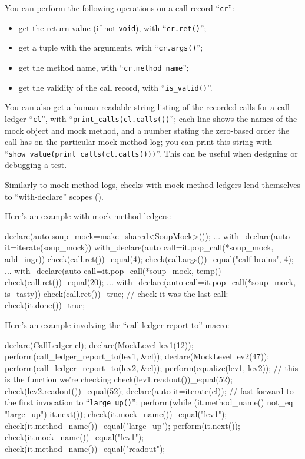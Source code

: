 \documentclass[twoside, a4paper, article]{memoir}
\begin{document}
You can perform the following operations on a call record ``\texttt{cr}'':
\begin{itemize}
\item get the return value (if not \texttt{void}), with ``\texttt{cr.ret()}'';
\item get a tuple with the arguments, with ``\texttt{cr.args()}'';
\item get the method name, with ``\texttt{cr.method\_name}'';
\item get the validity of the call record, with ``\texttt{is\_valid()}''.
\end{itemize}

You can also get a human-readable string listing of the recorded calls for a
call ledger ``\texttt{cl}'', with ``\texttt{print\_calls(cl.calls())}''; each
line shows the names of the mock object and mock method, and a number stating
the zero-based order the call has on the particular mock-method log; you can
print this string with ``\texttt{show\_value(print\_calls(cl.calls()))}''.
This can be useful when designing or debugging a test.

Similarly to mock-method logs, checks with mock-method ledgers lend themselves
to ``with-declare'' scopes ().

Here's an example with mock-method ledgers:
\begin{cpplisting}
declare(auto soup_mock=make_shared<SoupMock>());
...
with_declare(auto it=iterate(soup_mock)) {
  with_declare(auto call=it.pop_call(*soup_mock, add_ingr)) {
    check(call.ret())_equal(4);
    check(call.args())_equal("calf brains", 4);
  }
  ...
  with_declare(auto call=it.pop_call(*soup_mock, temp))
    check(call.ret())_equal(20);
  ...
  with_declare(auto call=it.pop_call(*soup_mock, is_tasty))
    check(call.ret())_true;
  // check it was the last call:
  check(it.done())_true;
}
\end{cpplisting}

Here's an example involving the ``call-ledger-report-to'' macro:
\begin{cpplisting}
declare(CallLedger cl);
declare(MockLevel lev1(12));
perform(call_ledger_report_to(lev1, &cl));
declare(MockLevel lev2(47));
perform(call_ledger_report_to(lev2, &cl));
perform(equalize(lev1, lev2)); // this is the function we're checking
check(lev1.readout())_equal(52);
check(lev2.readout())_equal(52);
declare(auto it=iterate(cl));
// fast forward to the first invocation to ``\texttt{large\_up()}'':
perform(while (it.method_name() not_eq "large_up")
          it.next());
check(it.mock_name())_equal("lev1");
check(it.method_name())_equal("large_up");
perform(it.next());
check(it.mock_name())_equal("lev1");
check(it.method_name())_equal("readout");
\end{cpplisting}
\end{document}

